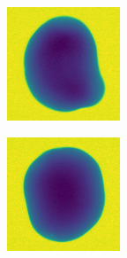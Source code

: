 \documentclass[11pt]{article}
\begin{document}
\begin{figure}[!h]
\begin{subfigure}[b]{0.22\textwidth}
         \caption{}
         \label{fig:perfect_33}
     \end{subfigure}
     \hfill
     \begin{subfigure}[b]{0.22\textwidth}
         \centering
         \includegraphics[width=\textwidth]{figurer/potato_dataset/perfect/perfect_34.jpg}
         \caption{}
         \label{fig:perfect_34}
     \end{subfigure}
     \hfill
     \begin{subfigure}[b]{0.22\textwidth}
         \centering
         \includegraphics[width=\textwidth]{figurer/potato_dataset/perfect/perfect_35.jpg}

\end{subfigure}
\end{figure}
\end{document}
